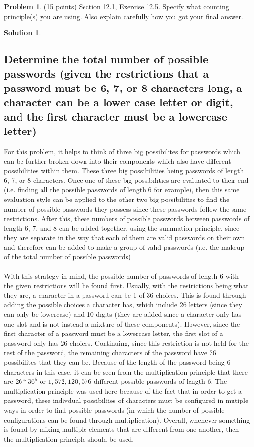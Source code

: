 \documentclass{article}
\theoremstyle{definition}
\newtheorem{problem}{Problem}
\newtheorem*{solution}{Solution}
\begin{document}
\newpage
\begin{problem} (15 points) Section 12.1, Exercise 12.5.  Specify what counting principle(s)
you are using.  Also explain carefully how you got your final answer.
\end{problem}
\begin{solution}
\hspace{1cm}
\subsection*{Determine the total number of possible passwords (given the restrictions that a password must be 6, 7, or 8 characters long, a character can be a lower case letter or digit, and the first character must be a lowercase letter)}
For this problem, it helps to think of three big possibilites for passwords which can be further broken down into their components which also have different possibilities within them. These three big possibilities being passwords of length 6, 7, or 8 characters. Once one of these big possibilities are evaluated to their end (i.e. finding all the possible passwords of length 6 for example), then this same evaluation style can be applied to the other two big possibilities to find the number of possible passwords they possess since these passwords follow the same restrictions. After this, these numbers of possible passwords between passwords of length 6, 7, and 8 can be added together, using the summation principle, since they are separate in the way that each of them are valid passwords on their own and therefore can be added to make a group of valid passwords (i.e. the makeup of the total number of possible passwords)\\\\
With this strategy in mind, the possible number of passwords of length 6 with the given restrictions will be found first. Usually, with the restrictions being what they are, a character in a password can be 1 of 36 choices. This is found through adding the possible choices a character has, which include 26 letters (since they can only be lowercase) and 10 digits (they are added since a character only has one slot and is not instead a mixture of these components). However, since the first character of a password must be a lowercase letter, the first slot of a password only has 26 choices. Continuing, since this restriction is not held for the rest of the password, the remaining characters of the password have 36 possibilites that they can be. Because of the length of the password being 6 characters in this case, it can be seen from the multiplication principle that there are $26 * 36^5$ or $1,572,120,576$ different possible passwords of length 6. The multiplication principle was used here because of the fact that in order to get a password, these indivdual possibilties of characters must be configured in mutiple ways in order to find possible passwords (in which the number of possible configurations can be found through multiplication). Overall, whenever something is found by mixing multiple elements that are different from one another, then the multiplication principle should be used.\\\\

\end{solution}
\end{document}
